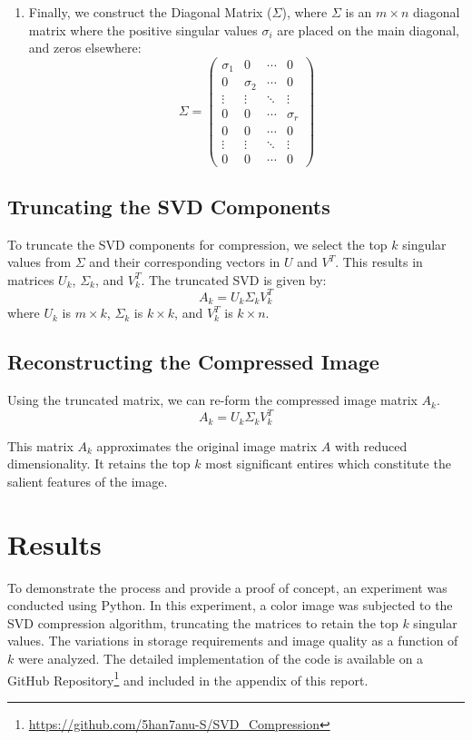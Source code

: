 \documentclass[12pt]{article}
\begin{document}
\begin{enumerate}
    \item Finally, we construct the Diagonal Matrix (\(\Sigma\)), where \(\Sigma\) is an \(m \times n\) diagonal matrix where the positive singular values \(\sigma_i\) are placed on the main diagonal, and zeros elsewhere:
    \[
    \Sigma = 
    \begin{pmatrix}
    \sigma_1 & 0 & \cdots & 0 \\
    0 & \sigma_2 & \cdots & 0 \\
    \vdots & \vdots & \ddots & \vdots \\
    0 & 0 & \cdots & \sigma_r \\
    0 & 0 & \cdots & 0 \\
    \vdots & \vdots & \ddots & \vdots \\
    0 & 0 & \cdots & 0
    \end{pmatrix}
    \]

\end{enumerate}


\subsection{Truncating the SVD Components}

To truncate the SVD components for compression, we select the top \(k\) singular values from \(\Sigma\) and their corresponding vectors in \(U\) and \(V^T\). This results in matrices \(U_k\), \(\Sigma_k\), and \(V_k^T\). The truncated SVD is given by:
\[
A_k = U_k \Sigma_k V_k^T
\]
where \(U_k\) is \(m \times k\), \(\Sigma_k\) is \(k \times k\), and \(V_k^T\) is \(k \times n\).

\subsection{Reconstructing the Compressed Image}
Using the truncated matrix, we can re-form the compressed image matrix \(A_k\).
\[
A_k = U_k \Sigma_k V_k^T
\]

This matrix \(A_k\) approximates the original image matrix \(A\) with reduced dimensionality. It retains the top \(k \) most significant entires which constitute the salient features of the image.

\section{Results}

To demonstrate the process and provide a proof of concept, an experiment was conducted using Python. In this experiment, a color image was subjected to the SVD compression algorithm, truncating the matrices to retain the top \(k\) singular values. The variations in storage requirements and image quality as a function of \(k\) were analyzed. The detailed implementation of the code is available on a {GitHub Repository}\footnote{\href{https://github.com/5han7anu-S/SVD_Compression}{https://github.com/5han7anu-S/SVD\_Compression}} and included in the appendix of this report.
\end{document}
